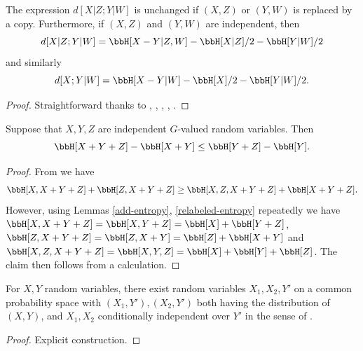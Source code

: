 \begin{lemma}\label{cond-dist-alt}
\leanok
  The expression $d[X  | Z;Y | W]$ is unchanged if $(X,Z)$ or $(Y,W)$ is replaced by a copy.  Furthermore, if $(X,Z)$ and $(Y,W)$ are independent, then
$$  d[X  | Z;Y | W] = \bbH[X-Y|Z,W] - \bbH[X|Z]/2 - \bbH[Y|W]/2$$
and similarly
$$  d[X ;Y | W] = \bbH[X-Y|W] - \bbH[X]/2 - \bbH[Y|W]/2.$$
\end{lemma}

\begin{proof}\leanok Straightforward thanks to , , , , .
\end{proof}

\begin{lemma}\label{kv}
  \leanok
Suppose that $X, Y, Z$ are independent $G$-valued random variables. Then
\[
  \bbH[X + Y + Z] - \bbH[X + Y] \leq \bbH[Y+ Z] - \bbH[Y].
\]
\end{lemma}

\begin{proof}\leanok
From  we have
$$ \bbH[X, X + Y+ Z] + \bbH[Z, X + Y+ Z] \geq \bbH[X, Z, X + Y+ Z] + \bbH[X + Y+ Z].$$
However, using Lemmas \ref{add-entropy}, \ref{relabeled-entropy} repeatedly we have $\bbH[X, X + Y+ Z] = \bbH[X, Y+ Z] = \bbH[X] + \bbH[Y+ Z]$, $\bbH[Z, X + Y + Z] = \bbH[Z, X + Y] = \bbH[Z] + \bbH[X + Y]$ and $\bbH[X, Z, X + Y+ Z] = \bbH[X, Y, Z] = \bbH[X] + \bbH[Y] + \bbH[Z]$.  The claim then follows from a calculation.
\end{proof}

\begin{lemma}\label{cond-indep-exist}
  \leanok
  For $X,Y$ random variables, there exist random variables $X_1,X_2,Y'$ on a common probability space with $(X_1, Y'), (X_2, Y')$ both having the distribution of $(X,Y)$, and $X_1, X_2$ conditionally independent over $Y'$ in the sense of .
\end{lemma}

\begin{proof}\leanok Explicit construction.
\end{proof}


